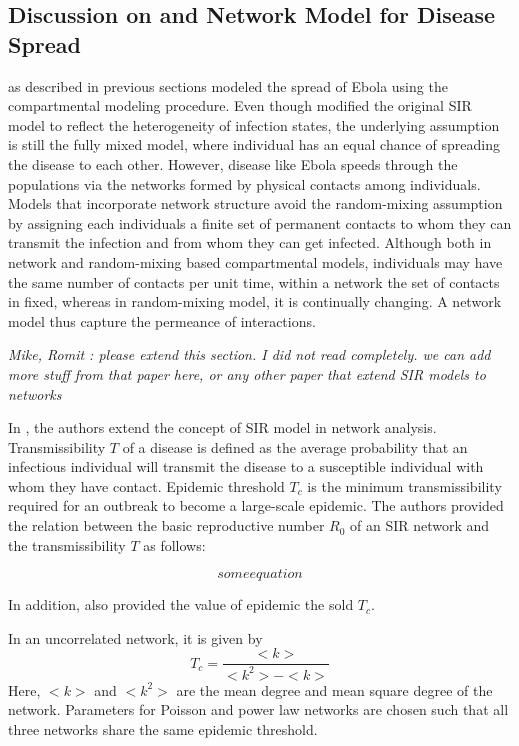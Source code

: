 \documentclass[12pt, journal,onecolumn]{IEEEtran}
\begin{document}
\subsection{Discussion on \cite{chowell2004basic, legrand2007understanding} and Network Model for Disease Spread \cite{newman2002spread}}
\cite{chowell2004basic, legrand2007understanding} as described in previous sections modeled the spread of Ebola using the compartmental modeling procedure. Even though \cite{legrand2007understanding} modified the original SIR model to reflect the heterogeneity of infection states, the underlying assumption is still the fully mixed model, where individual has an equal chance of spreading the disease to each other. However, disease like Ebola speeds through the populations via the networks formed by physical contacts among individuals. Models that incorporate network structure avoid the random-mixing assumption by assigning each individuals a finite set of permanent contacts to whom they can transmit the infection and from whom they can get infected. Although both in network and random-mixing based compartmental models, individuals may have the same number of contacts per unit time, within a network the set of contacts in fixed, whereas in random-mixing model, it is continually changing. A network model thus capture the permeance of interactions.


\bigskip 
{\em{Mike, Romit : please extend this section. I did not read \cite{newman2002spread} completely. we can add more stuff from that paper here, or any other paper that extend SIR models to networks}}

In \cite{newman2002spread}, the authors extend the concept of SIR model in network analysis. Transmissibility $T$ of a disease is defined as the average probability that an infectious individual will transmit the disease to a susceptible individual with whom they have contact. Epidemic threshold $T_c$ is the minimum transmissibility required for an outbreak to become a large-scale epidemic. The authors provided the relation between the basic reproductive number $R_0$ of an SIR network and the transmissibility $T$ as follows:

\[
some equation
\]

In addition, \cite{newman2002spread} also provided the value of epidemic the sold $T_c$. 

In an uncorrelated network, it is given by
\[
T_c =\dfrac{<k>}{<k^2> - <k>}
\]
Here, $<k>$ and $<k^2>$ are the mean degree and mean square degree of the network. Parameters for Poisson and power law networks are chosen such that all three networks share the same epidemic threshold.
\end{document}
